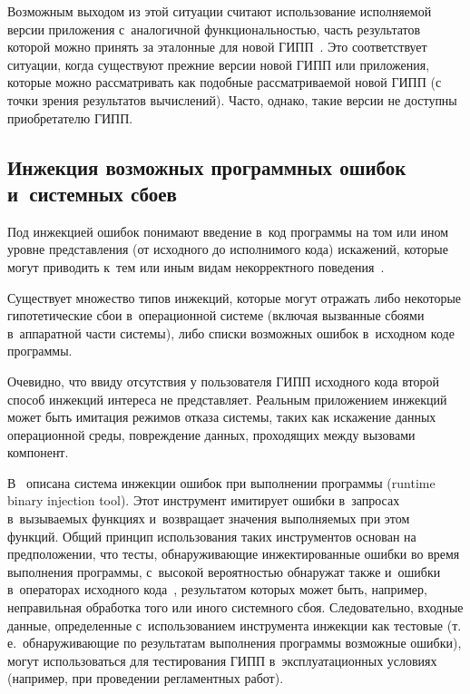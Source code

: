 \begin{multicols}{2}
    Возможным выходом из этой ситуации считают использование 
исполняемой версии приложения с~аналогичной функциональностью, часть 
результатов которой можно принять за эталонные для новой  
ГИПП~\cite{2-bf, 11-bf}. Это соответствует ситуации, когда существуют 
прежние версии новой ГИПП или приложения, которые можно 
рассматривать как подобные рассматриваемой новой ГИПП (с точки зрения 
результатов вычислений). Часто, однако, такие версии не доступны 
приобретателю ГИПП.

\vspace*{-3pt}
    
    \subsection{Инжекция возможных программных ошибок 
и~системных сбоев}

\vspace*{-1pt}
    
    Под инжекцией ошибок понимают введение в~код программы на том 
или ином уровне представления (от исходного до исполнимого кода) 
искажений, которые могут приводить к~тем или иным видам некорректного 
поведения~\cite{8-bf}.
    
    Существует множество типов инжекций, которые могут отражать либо 
некоторые гипотетические сбои в~операционной системе (включая 
вызванные сбоями в~аппаратной части системы), либо списки возможных 
ошибок в~исходном коде программы.
    
    Очевидно, что ввиду отсутствия у пользователя ГИПП исходного кода 
второй способ инжекций интереса не представляет. Реальным приложением 
инжекций может быть имитация режимов отказа системы, таких как 
искажение данных операционной среды, повреждение данных, проходящих 
между вызовами компонент.
    
    В~\cite{10-bf} описана система инжекции ошибок при выполнении 
программы (runtime binary injection tool).
    Этот инструмент имитирует ошибки в~запросах в~вызываемых функциях 
и~возвращает значения выполняемых при этом функций. Общий принцип 
использования таких инструментов основан на предположении, что тесты, 
обнаруживающие инжектированные ошибки во время выполнения 
программы, с~высокой вероятностью обнаружат также и~ошибки 
в~операторах исходного кода~\cite{11-bf}, результатом которых может быть, 
например, неправильная обработка того или иного системного сбоя. 
Следовательно, входные данные, определенные с~использованием 
инструмента инжекции как тестовые (т.\,е.\ обнаруживающие по результатам 
выполнения программы возможные ошибки), могут использоваться для 
тестирования ГИПП в~эксплуатационных условиях (например, при 
проведении регламентных работ).
    

\end{multicols}
